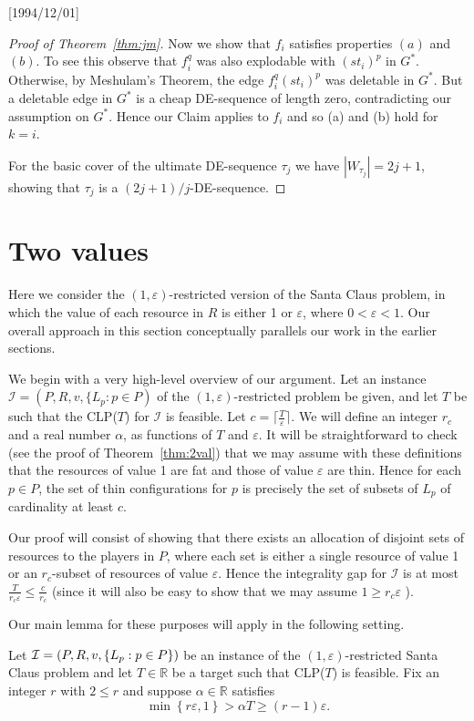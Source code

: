 \NeedsTeXFormat{LaTeX2e}[1994/12/01]\documentclass[letterpaper, 11pt]{article}
\theoremstyle{definition}
\theoremstyle{remark}
\numberwithin{equation}{section}
\newcommand{\cI}{\mathcal{I}}
\newcommand{\veps}{\varepsilon}
\begin{document}
\begin{proof}[Proof of Theorem~\ref{thm:jm}]
Now we show that $f_i$ satisfies properties $(a)$ and $(b)$. To
see this observe that $f_i^q$ was also explodable with $(st_i)^p$ in
$G^*$. 
Otherwise, by Meshulam's Theorem, the edge $f_i^q(st_i)^p$ was
deletable in $G^*$. But a deletable
edge in $G^*$ is a cheap DE-sequence of length zero, contradicting our
assumption on $G^*$. 
Hence our Claim applies to $f_i$ and so (a) and (b) hold for $k=i$.

For the basic cover of the ultimate DE-sequence $\tau_j$ we have
  $|W_{\tau_{j}}|  = 2j+1$, showing that $\tau_j$ is a $(2j+1)/j$-DE-sequence.
    \end{proof}

\section{Two values}\label{sec:2val}

Here we consider the $(1,\varepsilon)$-restricted version
of the Santa Claus problem, in which the value of each resource in $R$ is either 1 or $\veps$, where $0<\varepsilon<1$. Our overall approach in this section conceptually
parallels our work in the earlier sections.

We begin with a very high-level overview of our argument. Let
  an instance $\cI=(P,R,v,\{L_p:p\in P)$ of the
  $(1,\varepsilon)$-restricted problem be 
  given, and let $T$ be such that the CLP($T$) for $\cI$ is
  feasible. Let $c=\lceil\frac{T}{\veps} \rceil$. We will define an
  integer $r_c$ and a real number $\alpha$, as functions of $T$ and $\veps$.
  It will be
  straightforward to check (see the proof of Theorem~\ref{thm:2val})
  that we may assume with these definitions that the resources of
  value 1 are fat and those of value $\veps$ are thin. Hence for each
  $p\in P$, the set of thin configurations for $p$ is precisely the
  set of subsets of $L_p$ of cardinality at least $c$.

  Our proof will consist of showing that there exists an allocation
  of disjoint sets of resources to the players in $P$, where each
  set is either a single resource of value 1 or an $r_c$-subset of
  resources of value $\veps$. Hence the integrality gap for $\cI$ is
  at most $\frac{T}{r_c\veps}\leq\frac{c}{r_c}$ (since it will also be easy to show that we may assume   $1\geq r_c\veps$ ).

Our main lemma for these purposes will apply in the following setting.

\medskip

Let ${\cal I} = (P, R , v, \{L_p : p\in P\})$ be an instance of the
$(1,\veps)$-restricted Santa Claus problem and let $T\in \mathbb{R}$
be a target such that 
CLP($T$) is feasible. Fix an integer $r$ with $2\leq r$
and suppose $\alpha\in \mathbb{R}$ satisfies $$\min\left\{r\veps, 1 \right\}  > \alpha T \geq (r-1)\veps.$$ 
\end{document}
